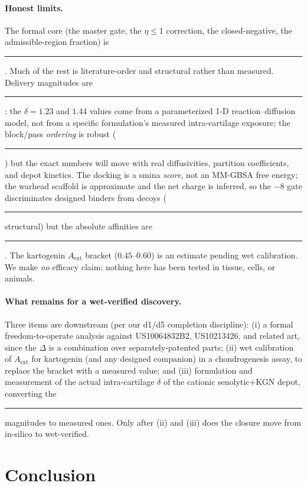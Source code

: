 \documentclass[11pt,a4paper]{article}
\newcommand{\tierdisc}[1]{\textcolor{#1}{\rule[0.05ex]{1.0ex}{1.0ex}}}
\newcommand{\tierBlue}{\tierdisc{blue!70!black}}   %
\newcommand{\tierGreen}{\tierdisc{green!60!black}} %
\newcommand{\tierOrange}{\tierdisc{orange!90!black}} %
\begin{document}
\paragraph{Honest limits.}
The formal core (the master gate, the $\eta\le1$ correction, the closed-negative,
the admissible-region fraction) is \tierBlue{}. Much of the rest is
literature-order and structural rather than measured. Delivery magnitudes are
\tierOrange{}: the $\delta=1.23$ and $1.44$ values come from a parameterized 1-D
reaction--diffusion model, not from a specific formulation's measured
intra-cartilage exposure; the block/pass \emph{ordering} is robust
(\tierGreen{}) but the exact numbers will move with real diffusivities, partition
coefficients, and depot kinetics. The docking is a smina \emph{score}, not an
MM-GBSA free energy; the warhead scaffold is approximate and the net charge is
inferred, so the $-8$ gate discriminates designed binders from decoys
(\tierGreen{} structural) but the absolute affinities are \tierOrange{}. The
kartogenin $A_{\mathrm{ext}}$ bracket ($0.45$--$0.60$) is an estimate pending wet
calibration. We make \emph{no} efficacy claim: nothing here has been tested in
tissue, cells, or animals.

\paragraph{What remains for a wet-verified discovery.}
Three items are downstream (per our d1/d5 completion discipline): (i) a formal
freedom-to-operate analysis against US10064832B2, US10213426, and related art, since
the $\Delta$ is a combination over separately-patented parts; (ii) wet calibration
of $A_{\mathrm{ext}}$ for kartogenin (and any designed companion) in a
chondrogenesis assay, to replace the bracket with a measured value; and (iii)
formulation and measurement of the actual intra-cartilage $\delta$ of the cationic
senolytic+KGN depot, converting the \tierOrange{} magnitudes to measured ones. Only
after (ii) and (iii) does the closure move from in-silico to wet-verified.

\section{Conclusion}
\end{document}
